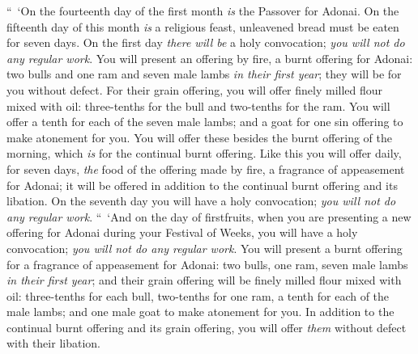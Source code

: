 \begin{biblechapter}
\verse “ ‘On the fourteenth day of the first month \textit{is} the Passover for Adonai.
\verse On the fifteenth day of this month \textit{is} a religious feast, unleavened bread must be eaten for seven days.
\verse On the first day \textit{there will be} a holy convocation; \textit{you will not do any regular work}.
\verse You will present an offering by fire, a burnt offering for Adonai: two bulls and one ram and seven male lambs \textit{in their first year}; they will be for you without defect.
\verse For their grain offering, you will offer finely milled flour mixed with oil: three-tenths for the bull and two-tenths for the ram.
\verse You will offer a tenth for each of the seven male lambs;
\verse and a goat for one sin offering to make atonement for you.
\verse You will offer these besides the burnt offering of the morning, which \textit{is} for the continual burnt offering.
\verse Like this you will offer daily, for seven days, \textit{the} food of the offering made by fire, a fragrance of appeasement for Adonai; it will be offered in addition to the continual burnt offering and its libation.
\verse On the seventh day you will have a holy convocation; \textit{you will not do any regular work}.
 “ ‘And on the day of firstfruits, when you are presenting a new offering for Adonai during your Festival of Weeks, you will have a holy convocation; \textit{you will not do any regular work}.
\verse You will present a burnt offering for a fragrance of appeasement for Adonai: two bulls, one ram, seven male lambs \textit{in their first year};
\verse and their grain offering will be finely milled flour mixed with oil: three-tenths for each bull, two-tenths for one ram,
\verse a tenth for each of the male lambs;
\verse and one male goat to make atonement for you.
\verse In addition to the continual burnt offering and its grain offering, you will offer \textit{them} without defect with their libation.
\end{biblechapter}

